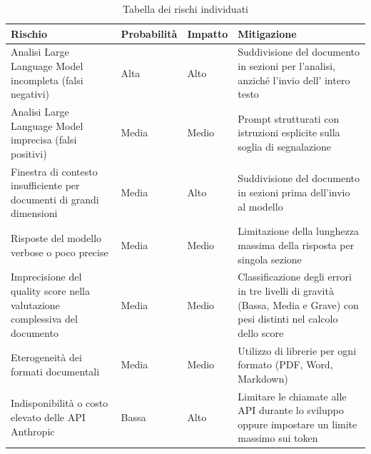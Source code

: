\begin{table}[h]
    \caption{Tabella dei rischi individuati}
\label{tab:rischi}
\begin{tabularx}{\textwidth}{XllX}
\hline\hline
\textbf{Rischio} & \textbf{Probabilità} & \textbf{Impatto} & \textbf{Mitigazione} \\
\hline
Analisi Large Language \newline Model incompleta \newline (falsi negativi)  & Alta  & Alto  & Suddivisione del \newline documento in sezioni per \newline l'analisi, anziché l'invio \newline dell' intero testo \\
\hline
Analisi Large Language \newline Model imprecisa (falsi \newline positivi) & Media & Medio & Prompt strutturati con \newline istruzioni esplicite sulla \newline soglia di segnalazione \\
\hline
Finestra di contesto \newline insufficiente per documenti di grandi dimensioni & Media & Alto & Suddivisione del documento in sezioni prima dell'invio al modello \\
\hline
Risposte del modello verbose o poco precise & Media & Medio & Limitazione della lunghezza massima della risposta per singola sezione \\
\hline
Imprecisione del quality \newline score nella valutazione \newline complessiva del documento & Media & Medio & Classificazione degli errori in tre livelli di gravità \newline (Bassa, Media e Grave) con pesi distinti nel calcolo dello score\\
\hline
Eterogeneità dei formati \newline documentali & Media & Medio & Utilizzo di librerie per ogni formato (PDF, Word, Markdown) \\
\hline
Indisponibilità o costo \newline elevato delle API Anthropic & Bassa & Alto & Limitare le chiamate alle API durante lo sviluppo \newline oppure impostare un limite massimo sui token \\
\hline
\end{tabularx}

\end{table}
